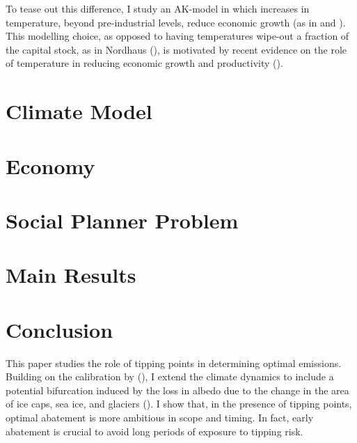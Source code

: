 \documentclass[american, abstract=off]{scrartcl}
\newcommand{\citein}[1]{\citeauthor{#1} (\citeyear{#1})}
\begin{document}
To tease out this difference, I study an AK-model in which increases in temperature, beyond pre-industrial levels, reduce economic growth (as in \cite{pindyck_economic_2013} and \cite{hambel_optimal_2021}). This modelling choice, as opposed to having temperatures wipe-out a fraction of the capital stock, as in Nordhaus (\citeyear{nordhaus_estimates_2014,nordhaus_question_2008,nordhaus_revisiting_2017}), is motivated by recent evidence on the role of temperature in reducing economic growth and productivity (\cite{burke_global_2015, dietz_growth_2019}).


\section{Climate Model}



\section{Economy}




\section{Social Planner Problem}



\section{Main Results}



\section{Conclusion}

This paper studies the role of tipping points in determining optimal emissions. Building on the calibration by \citein{hambel_optimal_2021}, I extend the climate dynamics to include a potential bifurcation induced by the loss in albedo due to the change in the area of ice caps, sea ice, and glaciers (\cite{ashwin_tipping_2012,ashwin_extreme_2020}). I show that, in the presence of tipping points, optimal abatement is more ambitious in scope and timing. In fact, early abatement is crucial to avoid long periods of exposure to tipping risk.
\end{document}
